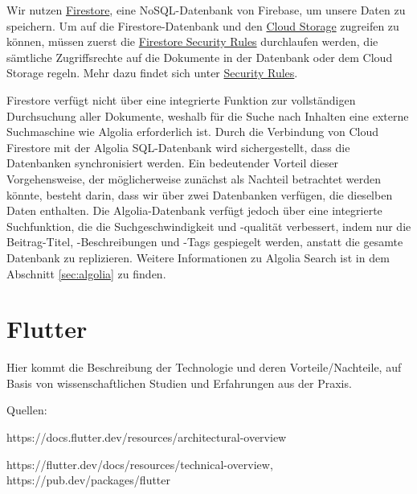 Wir nutzen \href{https://firebase.google.com/docs/firestore}{Firestore}, eine NoSQL-Datenbank von Firebase, um unsere Daten zu speichern. Um auf die Firestore-Datenbank und den \href{https://firebase.google.com/docs/storage}{Cloud Storage} zugreifen zu können, müssen zuerst die \href{https://firebase.google.com/docs/firestore/security/overview}{Firestore Security Rules} durchlaufen werden, die sämtliche Zugriffsrechte auf die Dokumente in der Datenbank oder dem Cloud Storage regeln. Mehr dazu findet sich unter \hyperref[sec:security-rules]{Security Rules}.

Firestore verfügt nicht über eine integrierte Funktion zur
vollständigen Durchsuchung aller Dokumente, weshalb für die
Suche nach Inhalten eine externe Suchmaschine wie Algolia
erforderlich ist. Durch die Verbindung von Cloud Firestore
mit der Algolia SQL-Datenbank wird sichergestellt, dass die
Datenbanken synchronisiert werden. Ein bedeutender Vorteil
dieser Vorgehensweise, der möglicherweise zunächst als
Nachteil betrachtet werden könnte, besteht darin, dass wir
über zwei Datenbanken verfügen, die dieselben Daten
enthalten. Die Algolia-Datenbank verfügt jedoch über eine
integrierte Suchfunktion, die die Suchgeschwindigkeit und
-qualität verbessert, indem nur die Beitrag-Titel,
-Beschreibungen und -Tags gespiegelt werden, anstatt die
gesamte Datenbank zu replizieren. Weitere Informationen zu
Algolia Search ist in dem Abschnitt \ref{sec:algolia} zu finden.

\section{Flutter}

Hier kommt die Beschreibung der Technologie und deren Vorteile/Nachteile, auf Basis von wissenschaftlichen Studien und Erfahrungen aus der Praxis.

Quellen:

https://docs.flutter.dev/resources/architectural-overview

https://flutter.dev/docs/resources/technical-overview,
https://pub.dev/packages/flutter



